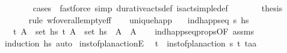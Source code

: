 \begin{isabellebody}
\ \ \ \ \ \ \isamarkupfalse%
\ {\isacharparenleft}{\kern0pt}cases\ {\isasympi}{\isacharparenright}{\kern0pt}\ {\isacharparenleft}{\kern0pt}fastforce\ simp{\isacharcolon}{\kern0pt}\ durative{\isacharunderscore}{\kern0pt}acts{\isacharunderscore}{\kern0pt}def\ is{\isacharunderscore}{\kern0pt}act{\isacharunderscore}{\kern0pt}simple{\isacharunderscore}{\kern0pt}def{\isacharparenright}{\kern0pt}{\isacharplus}{\kern0pt}\isanewline
\ \ \ \ \isamarkupfalse%
\ \isamarkupfalse%
\ {\isacharquery}{\kern0pt}thesis\ \isanewline
\ \ \ \ \ \ \isamarkupfalse%
{\isacharparenleft}{\kern0pt}rule\ wf{\isacharunderscore}{\kern0pt}over{\isacharunderscore}{\kern0pt}all{\isacharunderscore}{\kern0pt}empty{\isacharunderscore}{\kern0pt}eff{\isacharparenright}{\kern0pt}\isanewline
\ \ \isamarkupfalse%
%
\endisatagproof
{\isafoldproof}%
%
\isadelimproof
\isanewline
%
\endisadelimproof
\isanewline
{}\isamarkupfalse%
\ unique{\isacharunderscore}{\kern0pt}happ{\isacharcolon}{\kern0pt}\isanewline
\ \ \ {\isachardoublequoteopen}ind{\isacharunderscore}{\kern0pt}happ{\isacharunderscore}{\kern0pt}seq\ {\isasympi}s\ hs{\isachardoublequoteclose}\isanewline
\ \ \ {\isachardoublequoteopen}{\isasymlbrakk}{\isacharparenleft}{\kern0pt}t{\isacharcomma}{\kern0pt}\ A{\isacharparenright}{\kern0pt}\ {\isasymin}\ set\ hs{\isacharsemicolon}{\kern0pt}\ {\isacharparenleft}{\kern0pt}t{\isacharcomma}{\kern0pt}\ A{\isacharprime}{\kern0pt}{\isacharparenright}{\kern0pt}\ {\isasymin}\ set\ hs{\isasymrbrakk}\ {\isasymLongrightarrow}\ A\ {\isacharequal}{\kern0pt}\ A{\isacharprime}{\kern0pt}{\isachardoublequoteclose}\isanewline
%
\isadelimproof
\ \ %
\endisadelimproof
%
\isatagproof
{}\isamarkupfalse%
\ ind{\isacharunderscore}{\kern0pt}happ{\isacharunderscore}{\kern0pt}seq{\isacharunderscore}{\kern0pt}props{\isacharparenleft}{\kern0pt}{}{\isacharparenright}{\kern0pt}{\isacharbrackleft}{\kern0pt}OF\ assms{\isacharbrackright}{\kern0pt}\isanewline
\ \ \isamarkupfalse%
\ {\isacharparenleft}{\kern0pt}induction\ hs{\isacharparenright}{\kern0pt}\ auto%
\endisatagproof
{\isafoldproof}%
%
\isadelimproof
\isanewline
%
\endisadelimproof
\isanewline
{}\isamarkupfalse%
\ inst{\isacharunderscore}{\kern0pt}of{\isacharunderscore}{\kern0pt}plan{\isacharunderscore}{\kern0pt}actionE{\isacharcolon}{\kern0pt}\isanewline
\ \ {\isachardoublequoteopen}{\isasymAnd}t\isactrlsub {\isasympi}\ {\isasympi}{\isachardot}{\kern0pt}\ {\isasymlbrakk}inst{\isacharunderscore}{\kern0pt}of{\isacharunderscore}{\kern0pt}plan{\isacharunderscore}{\kern0pt}action\ {\isasympi}s\ {\isacharparenleft}{\kern0pt}t\isactrlsub {\isasympi}{\isacharcomma}{\kern0pt}{\isasympi}{\isacharparenright}{\kern0pt}\ {\isacharparenleft}{\kern0pt}t\isactrlsub a{\isacharcomma}{\kern0pt}a{\isacharparenright}{\kern0pt}{\isacharsemicolon}{\kern0pt}\isanewline

\end{isabellebody}
